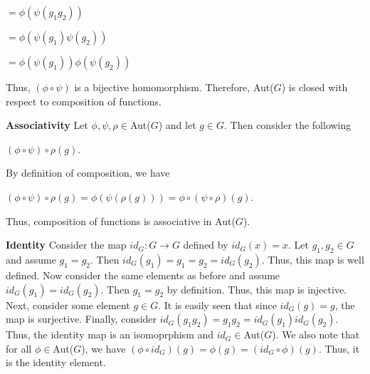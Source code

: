 \documentclass[12pt, a4paper]{article}
\begin{document}
\begin{description}
\vspace{2mm}

\hspace{18mm} $=\phi(\psi(g_1g_2))$

\vspace{2mm}

\hspace{18mm} $=\phi(\psi(g_1)\psi(g_2))$

\vspace{2mm}

\hspace{18mm} $=\phi(\psi(g_1))\phi(\psi(g_2))$

\vspace{4mm}

    Thus, $(\phi\circ\psi)$ is a bijective homomorphism. Therefore, Aut($G$) is closed with respect to composition of functions.
    
\vspace{4mm}
    
    \item \textbf{Associativity }Let $\phi,\psi,\rho\in$Aut($G$) and let $g\in G$. Then consider the following\par

\vspace{4mm}

        \centerline{$(\phi\circ\psi)\circ\rho(g)$.}
        
\vspace{4mm}

    By definition of composition, we have\par
    
\vspace{4mm}

        \centerline{$(\phi\circ\psi)\circ\rho(g)=\phi(\psi(\rho(g)))=\phi\circ(\psi\circ\rho)(g)$.}
        
\vspace{4mm}

    Thus, composition of functions is associative in Aut($G$).
    
\vspace{4mm}
    
    \item \textbf{Identity }Consider the map $id_G\colon G\rightarrow G$ defined by $id_G(x)=x$. Let $g_1,g_2\in G$ and assume $g_1=g_2$. Then $id_G(g_1)=g_1=g_2=id_G(g_2)$. Thus, this map is well defined. Now consider the same elements as before and assume $id_G(g_1)=id_G(g_2)$. Then $g_1=g_2$ by definition. Thus, this map is injective. Next, consider some element $g\in G$. It is easily seen that since $id_G(g)=g$, the map is surjective. Finally, consider $id_G(g_1g_2)=g_1g_2=id_G(g_1)id_G(g_2)$. Thus, the identity map is an isomoprphism and $id_G\in$Aut($G$). We also note that for all $\phi\in$Aut($G$), we have $(\phi\circ id_G)(g)=\phi(g)=(id_G\circ\phi)(g)$. Thus, it is the identity element.
    

\end{description}
\end{document}
